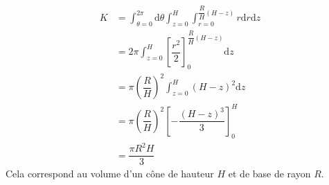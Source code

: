 %
\begin{corrige}
\begin{align*}
K & =\int_{\theta=0}^{2\pi}\mathrm{d}\theta\int_{z=0}^{H}\int_{r=0}^{\dfrac{R}{H}\left(H-z\right)}r\mathrm{d}r\mathrm{d}z\\
 & =2\pi\int_{z=0}^{H}\left[\dfrac{r^{2}}{2}\right]_{0}^{\dfrac{R}{H}\left(H-z\right)}\mathrm{d}z\\
 & =\pi\left(\dfrac{R}{H}\right)^{2}\int_{z=0}^{H}\left(H-z\right)^{2}\mathrm{d}z\\
 & =\pi\left(\dfrac{R}{H}\right)^{2}\left[-\dfrac{\left(H-z\right)^{3}}{3}\right]_{0}^{H}\\
 & =\dfrac{\pi R^{2}H}{3}
\end{align*}
 Cela correspond au volume d'un cône de hauteur $H$ et de base de
rayon $R$.

\end{corrige}
\finEntrainement







\afficheReponsesMelangees

\finFicheEntrainement                                                                        %


\ifdefined\mainIsLoaded\else
\printReponsesEtCorriges
\fi

